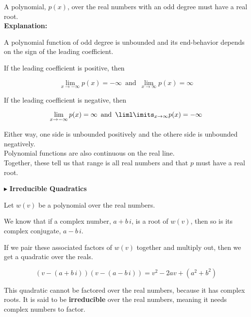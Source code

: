 \documentclass{ximera}
\begin{document}
\begin{explanation}


A polynomial, $p(x)$, over the real numbers with an odd degree must have a real root. \\



\textbf{Explanation: }



A polynomial function of odd degree is unbounded and its end-behavior depends on the sign of the leading coefficient.



If the leading coefficient is positive, then 

\[   \lim\limits_{x \to -\infty} p(x) = -\infty    \,   \text{ and } \,       \lim\limits_{x \to \infty} p(x) = \infty      \]



If the leading coefficient is negative, then 

\[   \lim\limits_{x \to -\infty} p(x) = \infty    \,   \text{ and } \,       \liml\imits_{x \to \infty} p(x) = -\infty      \]


Either way, one side is unbounded positively and the othere side is unbounded negatively. \\



Polynomial functions are also continuous on the real line. \\


Together, these tell us that range is all real numbers and that $p$ must have a real root.




\end{explanation}








$\blacktriangleright$  \textbf{Irreducible Quadratics}


Let $w(v)$ be a polynomial over the real numbers.

We know that if a complex number, $a + b \, i$, is a root of $w(v)$, then so is its complex conjugate, $a - b \,i$.

If we pair these associated factors of $w(v)$ together and multiply out, then we get a quadratic over the reals.

\[    (v - (a + b \, i)) (v -(a - b \, i))  = v^2 - 2a v + (a^2 + b^2)      \]


This quadratic cannot be factored over the real numbers, because it has complex roots.  It is said to be \textbf{irreducible} over the real numbers, meaning it needs complex numbers to factor.
\end{document}
